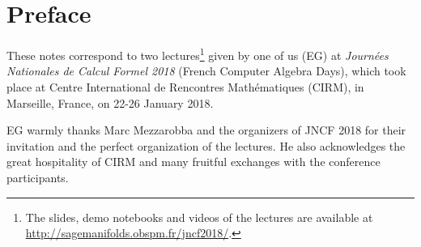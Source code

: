 \chapter*{Preface}
These notes correspond to two lectures\footnote{The slides, demo
notebooks and videos of the lectures are available at\\ \url{http://sagemanifolds.obspm.fr/jncf2018/}.} given by one of us (EG)
at \emph{Journées Nationales de Calcul Formel 2018}  (French Computer Algebra Days),
which took place at Centre International de Rencontres Mathématiques (CIRM),
in Marseille, France, on 22-26 January 2018.

EG warmly thanks Marc Mezzarobba and the organizers of JNCF 2018 for their
invitation and the perfect organization of the lectures. He also acknowledges
the great hospitality of CIRM and many fruitful exchanges with the conference
participants.
